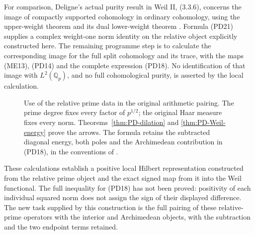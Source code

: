 \documentclass[11pt,a4paper]{article}
\theoremstyle{definition}\newtheorem{definition}[theorem]{Definition}
\newcommand{\Z}{\mathbb Z}\newcommand{\Q}{\mathbb Q}
\begin{document}
For comparison, Deligne's actual purity result in Weil II, (3.3.6),
concerns the image of compactly supported cohomology in ordinary
cohomology, using the upper-weight theorem and its dual lower-weight
theorem \cite{DeligneII}. Formula (PD21) supplies a complex weight-one
norm identity on the relative object explicitly constructed here. The
remaining programme step is to calculate the corresponding image for
the full split cohomology and its trace, with the maps (ME13), (PD14)
and the complete expression (PD18). No identification of that image
with $L^2(\Q_p)$, and no full cohomological purity, is asserted by
the local calculation.

\begin{figure}[ht]
\centering
{}
\caption{Use of the relative prime data in the original arithmetic pairing.
The prime degree fixes every factor of $p^{1/2}$; the original Haar
measure fixes every norm. Theorems~\ref{thm:PD-dilation} and
\ref{thm:PD-Weil-energy} prove the arrows. The formula retains the
subtracted diagonal energy, both poles and the Archimedean contribution
in (PD18), in the conventions of \cite{Connes1998,Connes2026}.}
\end{figure}

These calculations establish a positive local Hilbert representation
constructed from the relative prime object and the exact signed map
from it into the Weil functional. The full inequality for (PD18) has
not been proved: positivity of each individual squared norm does not
assign the sign of their displayed difference. The new task supplied
by this construction is the full pairing of these relative-prime
operators with the interior and Archimedean objects, with the
subtraction and the two endpoint terms retained.
\end{document}
